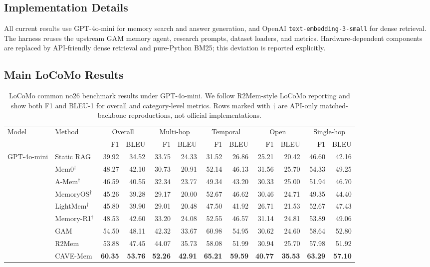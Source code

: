 \documentclass[conference]{IEEEtran}
\newcommand{\method}{CAVE-Mem}
\begin{document}
\subsection{Implementation Details}
All current results use GPT-4o-mini for memory search and answer generation,
and OpenAI \texttt{text-embedding-3-small} for dense retrieval. The harness
reuses the upstream GAM memory agent, research prompts, dataset loaders, and
metrics. Hardware-dependent components are replaced by API-friendly dense
retrieval and pure-Python BM25; this deviation is reported explicitly.

\subsection{Main LoCoMo Results}
\begin{table}[t]
\caption{LoCoMo common no26 benchmark results under GPT-4o-mini. We follow
R2Mem-style LoCoMo reporting and show both F1 and BLEU-1 for overall and
category-level metrics. Rows marked with $\dagger$ are API-only
matched-backbone reproductions, not official implementations.}
\label{tab:main}
\centering
\scriptsize
\setlength{\tabcolsep}{2.1pt}
\begin{tabular}{llrrrrrrrrrr}
\toprule
Model & Method
& \multicolumn{2}{c}{Overall}
& \multicolumn{2}{c}{Multi-hop}
& \multicolumn{2}{c}{Temporal}
& \multicolumn{2}{c}{Open}
& \multicolumn{2}{c}{Single-hop} \\
\cmidrule(lr){3-4}\cmidrule(lr){5-6}\cmidrule(lr){7-8}\cmidrule(lr){9-10}\cmidrule(lr){11-12}
& & F1 & BLEU & F1 & BLEU & F1 & BLEU & F1 & BLEU & F1 & BLEU \\
\midrule
\multirow{9}{*}{GPT-4o-mini}
& Static RAG & 39.92 & 34.52 & 33.75 & 24.33 & 31.52 & 26.86 & 25.21 & 20.42 & 46.60 & 42.16 \\
& Mem0$^\dagger$ & 48.27 & 42.10 & 30.73 & 20.91 & 52.14 & 46.13 & 31.56 & 25.70 & 54.33 & 49.25 \\
& A-Mem$^\dagger$ & 46.59 & 40.55 & 32.34 & 23.77 & 49.34 & 43.20 & 30.33 & 25.00 & 51.94 & 46.70 \\
& MemoryOS$^\dagger$ & 45.26 & 39.28 & 29.17 & 20.00 & 52.67 & 46.62 & 30.46 & 24.71 & 49.35 & 44.40 \\
& LightMem$^\dagger$ & 45.80 & 39.90 & 29.01 & 20.48 & 47.50 & 41.92 & 26.71 & 21.53 & 52.67 & 47.43 \\
& Memory-R1$^\dagger$ & 48.53 & 42.60 & 33.20 & 24.08 & 52.55 & 46.57 & 31.14 & 24.81 & 53.89 & 49.06 \\
& GAM & 54.50 & 48.11 & 42.32 & 33.67 & 60.98 & 54.95 & 30.62 & 24.60 & 58.64 & 52.80 \\
& R2Mem & 53.88 & 47.45 & 44.07 & 35.73 & 58.08 & 51.99 & 30.94 & 25.70 & 57.98 & 51.92 \\
& \method{} & \textbf{60.35} & \textbf{53.76} & \textbf{52.26} & \textbf{42.91} & \textbf{65.21} & \textbf{59.59} & \textbf{40.77} & \textbf{35.53} & \textbf{63.29} & \textbf{57.10} \\
\bottomrule
\end{tabular}
\end{table}
\end{document}
